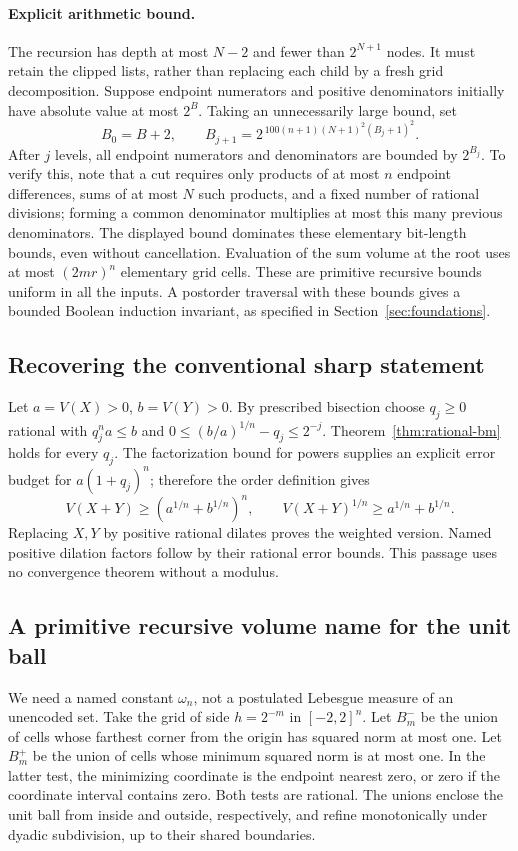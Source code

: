 \paragraph{Explicit arithmetic bound.}
The recursion has depth at most \(N-2\) and fewer than \(2^{N+1}\)
nodes. It must retain the clipped lists, rather than replacing each child
by a fresh grid decomposition. Suppose endpoint numerators and positive
denominators initially have absolute value at most \(2^B\).
Taking an unnecessarily large bound, set
\[
 B_0=B+2,\qquad
 B_{j+1}=2^{\,100(n+1)(N+1)^2(B_j+1)^2}.
\]
After \(j\) levels, all endpoint numerators and denominators are bounded
by \(2^{B_j}\). To verify this, note that a cut requires only products
of at most \(n\) endpoint differences, sums of at most \(N\) such
products, and a fixed number of rational divisions; forming a common
denominator multiplies at most this many previous denominators. The
displayed bound dominates these elementary bit-length bounds, even
without cancellation. Evaluation of the sum volume at the root uses
at most \((2mr)^n\) elementary grid cells. These are primitive recursive
bounds uniform in all the inputs. A postorder traversal with these bounds
gives a bounded Boolean induction invariant, as specified in
Section~\ref{sec:foundations}.

\subsection{Recovering the conventional sharp statement}

Let \(a=V(X)>0\), \(b=V(Y)>0\). By prescribed bisection choose
\(q_j\geq0\) rational with
\(q_j^na\leq b\) and \(0\leq(b/a)^{1/n}-q_j\leq2^{-j}\).
Theorem~\ref{thm:rational-bm} holds for every \(q_j\).
The factorization bound for powers supplies an explicit error budget
for \(a(1+q_j)^n\); therefore the order definition gives
\[
 V(X+Y)\geq(a^{1/n}+b^{1/n})^n,
 \qquad V(X+Y)^{1/n}\geq a^{1/n}+b^{1/n}.
\]
Replacing \(X,Y\) by positive rational dilates proves the weighted
version. Named positive dilation factors follow by their rational error
bounds. This passage uses no convergence theorem without a modulus.

\subsection{A primitive recursive volume name for the unit ball}

We need a named constant \(\omega_n\), not a postulated Lebesgue measure
of an unencoded set. Take the grid of side \(h=2^{-m}\) in \([-2,2]^n\).
Let \(B_m^-\) be the union of cells whose farthest corner from the origin
has squared norm at most one. Let \(B_m^+\) be the union of cells whose
minimum squared norm is at most one. In the latter test, the minimizing
coordinate is the endpoint nearest zero, or zero if the coordinate
interval contains zero. Both tests are rational. The unions enclose
the unit ball from inside and outside, respectively, and refine
monotonically under dyadic subdivision, up to their shared boundaries.

